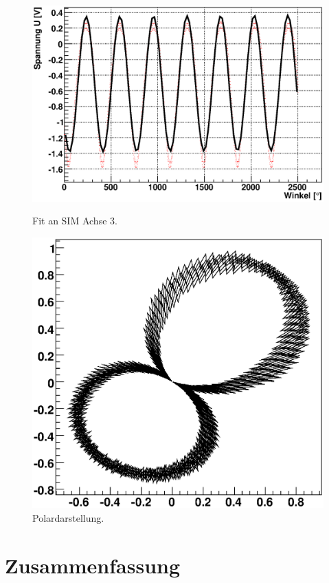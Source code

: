 \documentclass[12pt]{article}
\begin{document}
\begin{figure}[H]  
\begin{minipage}{0.5\linewidth}
\centering
\includegraphics[width=0.9\linewidth]{pictures/sim3.eps}
\caption{Fit an SIM Achse 3.}
\end{minipage}
\begin{minipage}{0.5\linewidth}
\centering 
\includegraphics[width=0.9\linewidth]{pictures/sim3vd.eps}
\caption{Polardarstellung.}
\end{minipage}
\end{figure}
\newpage

\section{Zusammenfassung}
\end{document}
